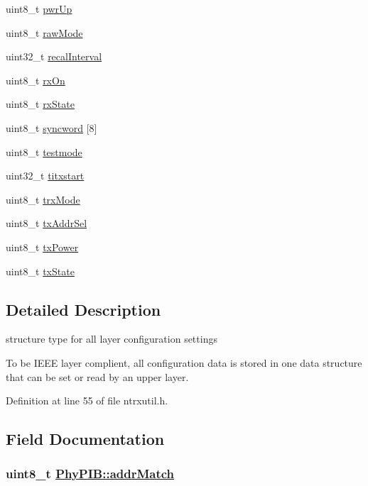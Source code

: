 \begin{CompactItemize}
\item 
uint8\_\-t \hyperlink{structPhyPIB_31b89c3ffa3b9f41761eea63187b747f}{pwr\-Up}
\item 
uint8\_\-t \hyperlink{structPhyPIB_d4a13e7ef40fdd6bb3beb85cd0abc810}{raw\-Mode}
\item 
uint32\_\-t \hyperlink{structPhyPIB_3130a146ce313790b7fa309e9bb22f81}{recal\-Interval}
\item 
uint8\_\-t \hyperlink{structPhyPIB_33eae89abb0e1cd8c71db6b89bd97b81}{rx\-On}
\item 
uint8\_\-t \hyperlink{structPhyPIB_5e268f5bfad168fc2a870cb622c66438}{rx\-State}
\item 
uint8\_\-t \hyperlink{structPhyPIB_3da678ca37d438cfe50f72de04372b49}{syncword} \mbox{[}8\mbox{]}
\item 
uint8\_\-t \hyperlink{structPhyPIB_f75531abe6c8375225a7d41947bba4be}{testmode}
\item 
uint32\_\-t \hyperlink{structPhyPIB_7434c7504f41779007906b624ed403e3}{titxstart}
\item 
uint8\_\-t \hyperlink{structPhyPIB_dcc3b9b40a2e583cf68cea317a7995a2}{trx\-Mode}
\item 
uint8\_\-t \hyperlink{structPhyPIB_e3bb971b3713048a693899634f59f1f5}{tx\-Addr\-Sel}
\item 
uint8\_\-t \hyperlink{structPhyPIB_6d4745474c95ac5ac8f6490c92208b2f}{tx\-Power}
\item 
uint8\_\-t \hyperlink{structPhyPIB_6b2e737693233d1e6b05703f8150b1a3}{tx\-State}
\end{CompactItemize}


\subsection{Detailed Description}
structure type for all layer configuration settings 

To be IEEE layer complient, all configuration data is stored in one data structure that can be set or read by an upper layer. 



Definition at line 55 of file ntrxutil.h.

\subsection{Field Documentation}
\hypertarget{structPhyPIB_d9f427fffb85f5e78768cdb51d926ddf}{
\subsubsection[addrMatch]{\setlength{\rightskip}{0pt plus 5cm}uint8\_\-t \hyperlink{structPhyPIB_d9f427fffb85f5e78768cdb51d926ddf}{Phy\-PIB::addr\-Match}}}
\label{structPhyPIB_d9f427fffb85f5e78768cdb51d926ddf}


